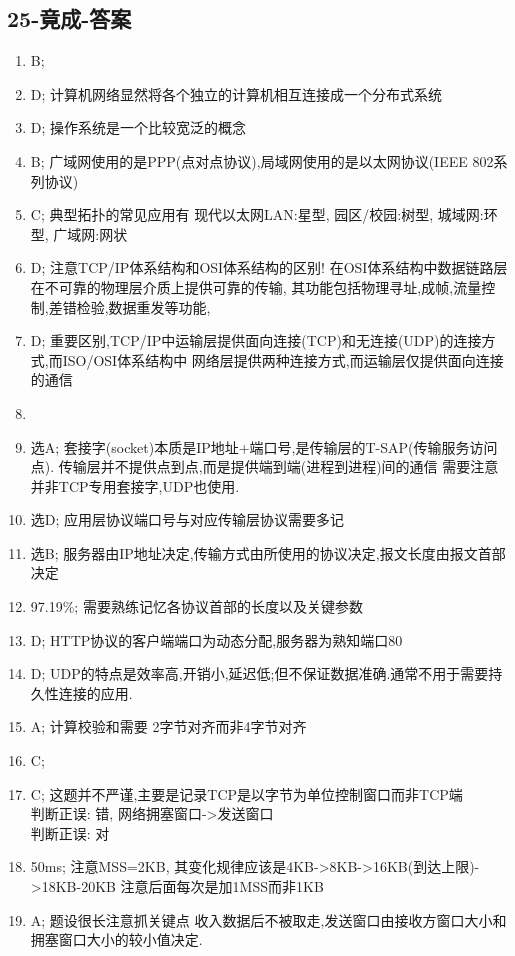 \documentclass[12pt, a4paper, oneside, UTF8]{ctexbook}
\begin{document}
\subsection{25-竟成-答案}
\begin{enumerate}
    \item B;
    \item D; 计算机网络显然将各个独立的计算机相互连接成一个分布式系统
    \item D; 操作系统是一个比较宽泛的概念
    \item B; 广域网使用的是PPP(点对点协议),局域网使用的是以太网协议(IEEE 802系列协议)
    \item C; 典型拓扑的常见应用有 {\color{red} 现代以太网LAN:星型, 园区/校园:树型, 城域网:环型, 广域网:网状}
    \item D; 注意TCP/IP体系结构和OSI体系结构的区别! 在OSI体系结构中数据链路层在不可靠的物理层介质上提供可靠的传输,
    其功能包括物理寻址,成帧,流量控制,差错检验,数据重发等功能,
    \item D; {\color{red} 重要区别,TCP/IP中运输层提供面向连接(TCP)和无连接(UDP)的连接方式,而ISO/OSI体系结构中
    网络层提供两种连接方式,而运输层仅提供面向连接的通信}
    \item 
    \item 选A; 套接字(socket)本质是IP地址+端口号,是传输层的T-SAP(传输服务访问点). 传输层并不提供{\color{red}点到点,而是提供端到端(进程到进程)间的通信}
    需要注意并非TCP专用套接字,UDP也使用. 
    \item 选D; 应用层协议端口号与对应传输层协议需要多记
    \item 选B; 服务器由IP地址决定,传输方式由所使用的协议决定,报文长度由报文首部决定
    \item 97.19\%; 需要熟练记忆各协议首部的长度以及关键参数 
    \item D; HTTP协议的客户端端口为动态分配,服务器为熟知端口80
    \item D; UDP的特点是效率高,开销小,延迟低;但不保证数据准确.通常不用于需要持久性连接的应用.
    \item A; 计算校验和需要{\color{red} 2字节对齐而非4字节对齐} 
    \item C;
    \item C; 这题并不严谨,主要是记录TCP是以字节为单位控制窗口而非TCP端 \\
    判断正误: 错, 网络拥塞窗口->发送窗口 \\
    判断正误: 对
    \item 50ms; 注意MSS=2KB, 其变化规律应该是4KB->8KB->16KB(到达上限)->18KB-20KB 注意后面每次是加1MSS而非1KB
    \item A; 题设很长注意抓关键点{\color{red} 收入数据后不被取走},发送窗口由接收方窗口大小和拥塞窗口大小的较小值决定.
\end{enumerate}
\end{document}
